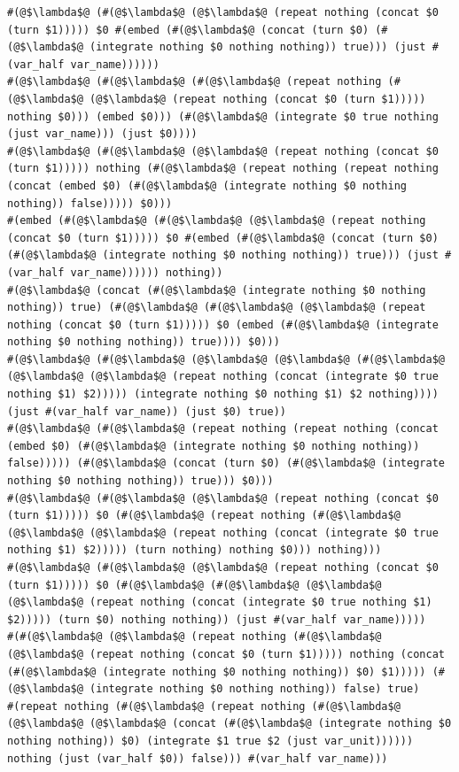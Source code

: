 \documentclass{article}
\begin{document}
\begin{lstlisting}
#(@$\lambda$@ (#(@$\lambda$@ (@$\lambda$@ (repeat nothing (concat $0 (turn $1))))) $0 #(embed (#(@$\lambda$@ (concat (turn $0) (#(@$\lambda$@ (integrate nothing $0 nothing nothing)) true))) (just #(var_half var_name))))))
#(@$\lambda$@ (#(@$\lambda$@ (#(@$\lambda$@ (repeat nothing (#(@$\lambda$@ (@$\lambda$@ (repeat nothing (concat $0 (turn $1))))) nothing $0))) (embed $0))) (#(@$\lambda$@ (integrate $0 true nothing (just var_name))) (just $0))))
#(@$\lambda$@ (#(@$\lambda$@ (@$\lambda$@ (repeat nothing (concat $0 (turn $1))))) nothing (#(@$\lambda$@ (repeat nothing (repeat nothing (concat (embed $0) (#(@$\lambda$@ (integrate nothing $0 nothing nothing)) false))))) $0)))
#(embed (#(@$\lambda$@ (#(@$\lambda$@ (@$\lambda$@ (repeat nothing (concat $0 (turn $1))))) $0 #(embed (#(@$\lambda$@ (concat (turn $0) (#(@$\lambda$@ (integrate nothing $0 nothing nothing)) true))) (just #(var_half var_name)))))) nothing))
#(@$\lambda$@ (concat (#(@$\lambda$@ (integrate nothing $0 nothing nothing)) true) (#(@$\lambda$@ (#(@$\lambda$@ (@$\lambda$@ (repeat nothing (concat $0 (turn $1))))) $0 (embed (#(@$\lambda$@ (integrate nothing $0 nothing nothing)) true)))) $0)))
#(@$\lambda$@ (#(@$\lambda$@ (@$\lambda$@ (@$\lambda$@ (#(@$\lambda$@ (@$\lambda$@ (@$\lambda$@ (repeat nothing (concat (integrate $0 true nothing $1) $2))))) (integrate nothing $0 nothing $1) $2 nothing)))) (just #(var_half var_name)) (just $0) true))
#(@$\lambda$@ (#(@$\lambda$@ (repeat nothing (repeat nothing (concat (embed $0) (#(@$\lambda$@ (integrate nothing $0 nothing nothing)) false))))) (#(@$\lambda$@ (concat (turn $0) (#(@$\lambda$@ (integrate nothing $0 nothing nothing)) true))) $0)))
#(@$\lambda$@ (#(@$\lambda$@ (@$\lambda$@ (repeat nothing (concat $0 (turn $1))))) $0 (#(@$\lambda$@ (repeat nothing (#(@$\lambda$@ (@$\lambda$@ (@$\lambda$@ (repeat nothing (concat (integrate $0 true nothing $1) $2))))) (turn nothing) nothing $0))) nothing)))
#(@$\lambda$@ (#(@$\lambda$@ (@$\lambda$@ (repeat nothing (concat $0 (turn $1))))) $0 (#(@$\lambda$@ (#(@$\lambda$@ (@$\lambda$@ (@$\lambda$@ (repeat nothing (concat (integrate $0 true nothing $1) $2))))) (turn $0) nothing nothing)) (just #(var_half var_name)))))
#(#(@$\lambda$@ (@$\lambda$@ (repeat nothing (#(@$\lambda$@ (@$\lambda$@ (repeat nothing (concat $0 (turn $1))))) nothing (concat (#(@$\lambda$@ (integrate nothing $0 nothing nothing)) $0) $1))))) (#(@$\lambda$@ (integrate nothing $0 nothing nothing)) false) true)
#(repeat nothing (#(@$\lambda$@ (repeat nothing (#(@$\lambda$@ (@$\lambda$@ (@$\lambda$@ (concat (#(@$\lambda$@ (integrate nothing $0 nothing nothing)) $0) (integrate $1 true $2 (just var_unit)))))) nothing (just (var_half $0)) false))) #(var_half var_name)))

\end{lstlisting}
\end{document}
